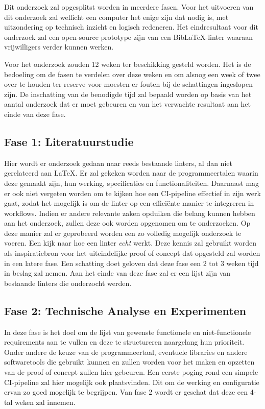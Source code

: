 Dit onderzoek zal opgesplitst worden in meerdere fasen. Voor het uitvoeren van dit onderzoek zal wellicht een computer het enige zijn dat nodig is, met uitzondering op technisch inzicht en logisch redeneren.
Het eindresultaat voor dit onderzoek zal een open-source prototype zijn van een BibLaTeX-linter waaraan vrijwilligers verder kunnen werken. \newline

Voor het onderzoek zouden 12 weken ter beschikking gesteld worden. Het is de bedoeling om de fasen te verdelen over deze weken en om alsnog een week of twee over te houden ter 
reserve voor moesten er fouten bij de schattingen ingeslopen zijn.
De inschatting van de benodigde tijd zal bepaald worden op basis van het aantal onderzoek dat er moet gebeuren en van het verwachte resultaat aan het einde van deze fase. 

\subsection{Fase 1: Literatuurstudie}
Hier wordt er onderzoek gedaan naar reeds bestaande linters, al dan niet gerelateerd aan LaTeX. Er zal gekeken worden naar de programmeertalen waarin deze gemaakt zijn, hun werking, specificaties en functionaliteiten. Daarnaast mag er ook niet vergeten worden om te kijken hoe een CI-pipeline effectief in zijn werk gaat, zodat het mogelijk is om de linter op een efficiënte manier te integreren in workflows.
Indien er andere
 relevante zaken opduiken die belang kunnen hebben aan het onderzoek, zullen deze ook worden opgenomen om te onderzoeken. Op deze manier zal er geprobeerd worden een zo volledig mogelijk onderzoek te voeren. 
Een kijk naar hoe een linter \emph{echt} werkt. Deze kennis zal gebruikt worden als inspiratiebron voor het uiteindelijke proof of concept dat opgesteld zal worden in een latere fase. Een schatting doet geloven dat deze fase een 2 
tot 3 weken tijd in beslag zal nemen. Aan het einde van deze fase zal er een lijst zijn van bestaande linters die onderzocht werden.

\subsection{Fase 2: Technische Analyse en Experimenten}
In deze fase is het doel om de lijst van gewenste functionele en niet-functionele requirements aan te vullen en deze te structureren naargelang hun prioriteit. Onder andere de keuze van de programmeertaal, eventuele libraries en andere softwaretools die gebruikt kunnen en zullen worden voor het maken en opzetten 
van de proof of concept zullen hier gebeuren. Een eerste poging rond een simpele CI-pipeline zal hier mogelijk ook plaatsvinden. Dit om de werking en configuratie ervan zo goed mogelijk te begrijpen. Van fase 2 wordt er geschat dat deze een 4-tal weken zal innemen.

